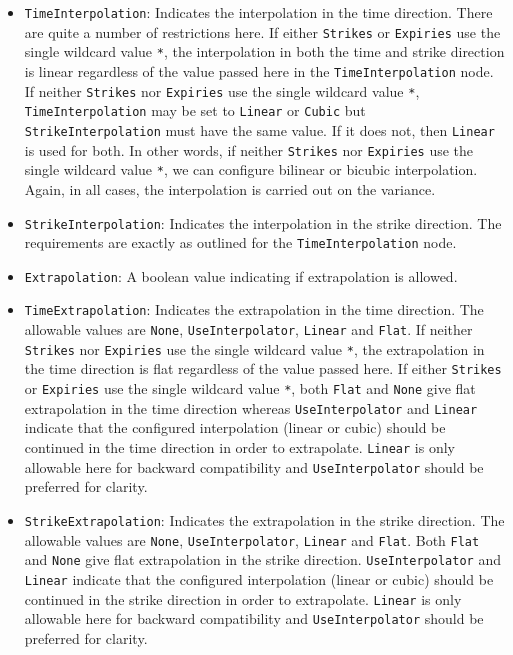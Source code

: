 \begin{itemize}
\item \lstinline!TimeInterpolation!:
Indicates the interpolation in the time direction. There are quite a number of restrictions here. If either \lstinline!Strikes! or \lstinline!Expiries! use the single wildcard value \lstinline!*!, the interpolation in both the time and strike direction is linear regardless of the value passed here in the \lstinline!TimeInterpolation! node. If neither \lstinline!Strikes! nor \lstinline!Expiries! use the single wildcard value \lstinline!*!, \lstinline!TimeInterpolation! may be set to \lstinline!Linear! or \lstinline!Cubic! but \lstinline!StrikeInterpolation! must have the same value. If it does not, then \lstinline!Linear! is used for both. In other words, if neither \lstinline!Strikes! nor \lstinline!Expiries! use the single wildcard value \lstinline!*!, we can configure bilinear or bicubic interpolation. Again, in all cases, the interpolation is carried out on the variance.

\item \lstinline!StrikeInterpolation!:
Indicates the interpolation in the strike direction. The requirements are exactly as outlined for the \lstinline!TimeInterpolation! node.

\item \lstinline!Extrapolation!:
A boolean value indicating if extrapolation is allowed.

\item \lstinline!TimeExtrapolation!:
Indicates the extrapolation in the time direction. The allowable values are \lstinline!None!, \lstinline!UseInterpolator!, \lstinline!Linear! and \lstinline!Flat!. If neither \lstinline!Strikes! nor \lstinline!Expiries! use the single wildcard value \lstinline!*!, the extrapolation in the time direction is flat regardless of the value passed here. If either \lstinline!Strikes! or \lstinline!Expiries! use the single wildcard value \lstinline!*!, both \lstinline!Flat! and \lstinline!None! give flat extrapolation in the time direction whereas \lstinline!UseInterpolator! and \lstinline!Linear! indicate that the configured interpolation (linear or cubic) should be continued in the time direction in order to extrapolate. \lstinline!Linear! is only allowable here for backward compatibility and \lstinline!UseInterpolator! should be preferred for clarity.

\item \lstinline!StrikeExtrapolation!:
Indicates the extrapolation in the strike direction. The allowable values are \lstinline!None!, \lstinline!UseInterpolator!, \lstinline!Linear! and \lstinline!Flat!. Both \lstinline!Flat! and \lstinline!None! give flat extrapolation in the strike direction. \lstinline!UseInterpolator! and \lstinline!Linear! indicate that the configured interpolation (linear or cubic) should be continued in the strike direction in order to extrapolate. \lstinline!Linear! is only allowable here for backward compatibility and \lstinline!UseInterpolator! should be preferred for clarity.


\end{itemize}
